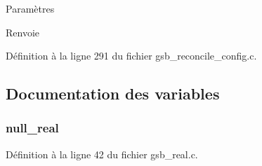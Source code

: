 \begin{DoxyParams}{Paramètres}
\item[{\em }]\end{DoxyParams}
\begin{DoxyReturn}{Renvoie}

\end{DoxyReturn}


Définition à la ligne 291 du fichier gsb\_\-reconcile\_\-config.c.



\subsection{Documentation des variables}
\subsubsection[{null\_\-real}]{ {\bf null\_\-real}}\label{gsb__reconcile__config_8c_a26f304bec3fdc0651b9aa8765d4de3c6}


Définition à la ligne 42 du fichier gsb\_\-real.c.

